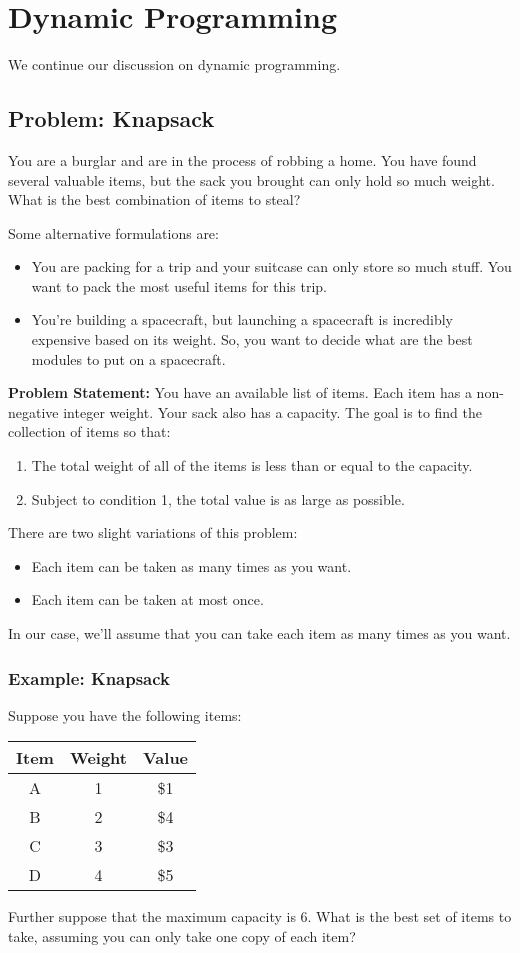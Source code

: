 \documentclass[letterpaper]{article}
\begin{document}
\section{Dynamic Programming}
We continue our discussion on dynamic programming. 

\subsection{Problem: Knapsack}
You are a burglar and are in the process of robbing a home. You have found several valuable items, but the sack you brought can only hold so much weight. What is the best combination of items to steal? 

\bigskip 

Some alternative formulations are: 
\begin{itemize}
    \item You are packing for a trip and your suitcase can only store so much stuff. You want to pack the most useful items for this trip. 
    \item You're building a spacecraft, but launching a spacecraft is incredibly expensive based on its weight. So, you want to decide what are the best modules to put on a spacecraft. 
\end{itemize}

\textbf{Problem Statement:} You have an available list of items. Each item has a non-negative integer weight. Your sack also has a capacity. The goal is to find the collection of items so that:
\begin{enumerate}
    \item The total weight of all of the items is less than or equal to the capacity.
    \item Subject to condition 1, the total value is as large as possible. 
\end{enumerate}
There are two slight variations of this problem:
\begin{itemize}
    \item Each item can be taken as many times as you want. 
    \item Each item can be taken at most once. 
\end{itemize}
In our case, we'll assume that you can take each item as many times as you want. 

\subsubsection{Example: Knapsack}
Suppose you have the following items: 
\begin{center}
    \begin{tabular}{c|c|c}
        \textbf{Item} & \textbf{Weight} & \textbf{Value} \\ 
        \hline 
        A & 1 & \$1 \\ 
        B & 2 & \$4 \\ 
        C & 3 & \$3 \\ 
        D & 4 & \$5
    \end{tabular}
\end{center}
Further suppose that the maximum capacity is 6. What is the best set of items to take, assuming you can only take one copy of each item? 
\end{document}
